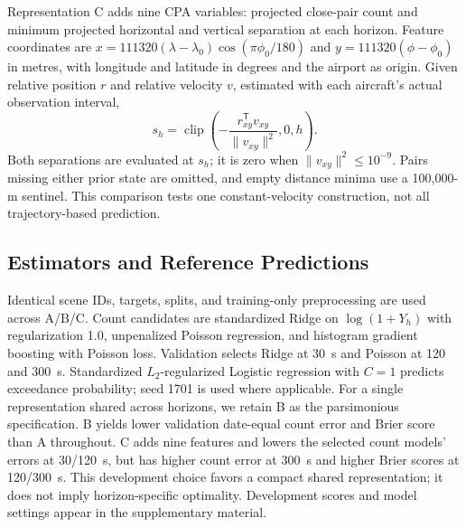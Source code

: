 \documentclass[10pt,journal,letterpaper]{IEEEtran}
\begin{document}
Representation C adds nine CPA variables: projected close-pair count and minimum projected horizontal and vertical separation at each horizon. Feature coordinates are $x=111320(\lambda-\lambda_0)\cos(\pi\phi_0/180)$ and $y=111320(\phi-\phi_0)$ in metres, with longitude and latitude in degrees and the airport as origin. Given relative position $r$ and relative velocity $v$, estimated with each aircraft's actual observation interval,
\begin{equation}
s_h=\operatorname{clip}\left(-\frac{r_{xy}^{\mathsf T}v_{xy}}{\|v_{xy}\|^2},0,h\right).
\label{eq:cpa}
\end{equation}
Both separations are evaluated at $s_h$; it is zero when $\|v_{xy}\|^2\leq10^{-9}$. Pairs missing either prior state are omitted, and empty distance minima use a 100,000-m sentinel. This comparison tests one constant-velocity construction, not all trajectory-based prediction.

\subsection{Estimators and Reference Predictions}
Identical scene IDs, targets, splits, and training-only preprocessing are used across A/B/C. Count candidates are standardized Ridge on $\log(1+Y_h)$ with regularization 1.0, unpenalized Poisson regression, and histogram gradient boosting with Poisson loss. Validation selects Ridge at 30~s and Poisson at 120 and 300~s. Standardized $L_2$-regularized Logistic regression with $C=1$ predicts exceedance probability; seed 1701 is used where applicable. For a single representation shared across horizons, we retain B as the parsimonious specification. B yields lower validation date-equal count error and Brier score than A throughout. C adds nine features and lowers the selected count models' errors at 30/120~s, but has higher count error at 300~s and higher Brier scores at 120/300~s. This development choice favors a compact shared representation; it does not imply horizon-specific optimality. Development scores and model settings appear in the supplementary material.
\end{document}
